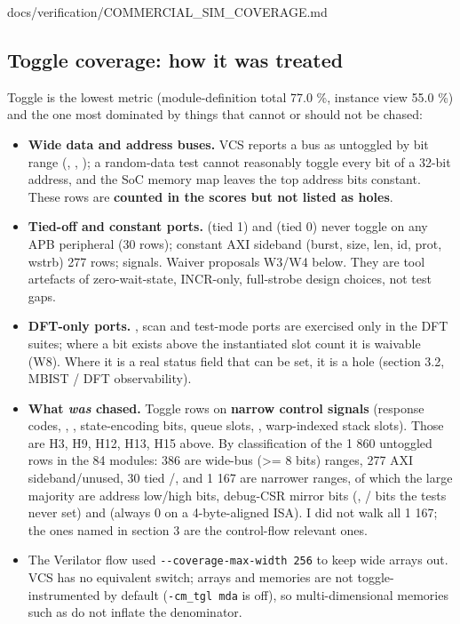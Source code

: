\begin{relocated}{docs/verification/COMMERCIAL_SIM_COVERAGE.md}
{}

\subsection{Toggle coverage: how it was treated}\label{tm:flow:commercial-sim-coverage:4-toggle-coverage-how-it-was-treated}

Toggle is the lowest metric (module-definition total 77.0 \%, instance
view 55.0 \%) and the one most dominated by things that cannot or should
not be chased:

\begin{itemize}
\tightlist
\item
  \textbf{Wide data and address buses.} VCS reports a bus as untoggled
  by bit range (, ,
  ); a random-data test cannot reasonably
  toggle every bit of a 32-bit address, and the SoC memory map leaves
  the top address bits constant. These rows are \textbf{counted in the
  scores but not listed as holes}.
\item
  \textbf{Tied-off and constant ports.}  (tied 1) and
   (tied 0) never toggle on any APB peripheral (30 rows);
  constant AXI sideband (burst, size, len, id, prot, wstrb) 277 rows;
   signals. Waiver proposals W3/W4 below. They are tool
  artefacts of zero-wait-state, INCR-only, full-strobe design choices,
  not test gaps.
\item
  \textbf{DFT-only ports.} , scan and test-mode
  ports are exercised only in the DFT suites; where a bit exists above
  the instantiated slot count it is waivable (W8). Where it is a real
  status field that can be set, it is a hole (section 3.2, MBIST / DFT
  observability).
\item
  \textbf{What \emph{was} chased.} Toggle rows on \textbf{narrow control
  signals} (response codes, , ,
  state-encoding bits, queue slots, , warp-indexed stack
  slots). Those are H3, H9, H12, H13, H15 above. By classification of
  the 1 860 untoggled rows in the 84  modules: 386 are
  wide-bus (\textgreater= 8 bits) ranges, 277 AXI
  sideband/\allowbreak{}unused, 30 tied /,
  and 1 167 are narrower ranges, of which the large majority are address
  low/high bits, debug-CSR mirror bits (,
  / bits the tests never set) and
   (always 0 on a 4-byte-aligned ISA). I did not walk all
  1 167; the ones named in section 3 are the control-flow relevant ones.
\item
  The Verilator flow used
  \texttt{-\allowbreak{}-\allowbreak{}coverage-\allowbreak{}max-\allowbreak{}width\ 256}
  to keep wide arrays out. VCS has no equivalent switch; arrays and
  memories are not toggle-instrumented by default
  (\texttt{-\allowbreak{}cm\_\allowbreak{}tgl\ mda} is off), so
  multi-dimensional memories such as  do not
  inflate the denominator.
\end{itemize}


\end{relocated}
